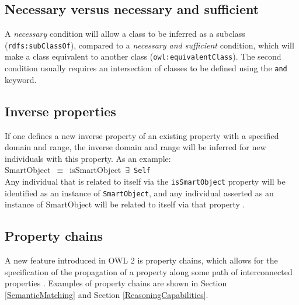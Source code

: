 \subsection{Necessary versus necessary and sufficient}

A \emph{necessary} condition will allow a class to be inferred as a subclass (\texttt{rdfs:subClassOf}), compared to a \emph{necessary and sufficient} condition, which will make a class equivalent to another class (\texttt{owl:equivalent\-Class}). The second condition usually requires an intersection of classes to be defined using the \texttt{and} keyword.


\subsection{Inverse properties}

If one defines a new inverse property of an existing property with a specified domain and range, the inverse domain and range will be inferred for new individuals with this property.  As an example:\\

\noindent
SmartObject~\ensuremath{\equiv}~isSmartObject~\ensuremath{\exists}~\texttt{Self}\\


Any individual that is related to itself via the \texttt{isSmartObject} property will be identified as an instance of \texttt{SmartObject}, and any individual asserted as an instance of SmartObject will be related to itself via that property \cite{Hoekstra2010}.


\subsection{Property chains}

A new feature introduced in \ac{OWL} 2 is property chains, which allows for the specification of the propagation of a property along some path of interconnected properties \cite{Hoekstra2008}. Examples of property chains are shown in Section \ref{SemanticMatching} and Section \ref{ReasoningCapabilities}.


